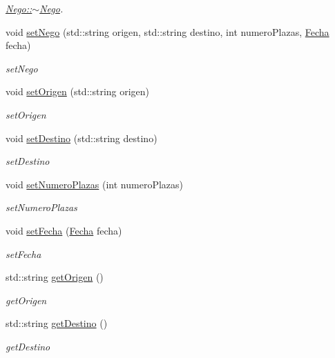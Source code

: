 \begin{DoxyCompactItemize}
\begin{DoxyCompactList}\small\item\em \hyperlink{classNego_af7be4e019e1aa8aaae080e9900574c74}{Nego\+::$\sim$\+Nego}. \end{DoxyCompactList}\item 
void \hyperlink{classNego_a886d652e1dd9f66c387978dbbcbf6aec}{set\+Nego} (std\+::string origen, std\+::string destino, int numero\+Plazas, \hyperlink{classFecha}{Fecha} fecha)
\begin{DoxyCompactList}\small\item\em set\+Nego \end{DoxyCompactList}\item 
void \hyperlink{classNego_ab9a55ac4fb4834dbede2806dbbcb62bb}{set\+Origen} (std\+::string origen)
\begin{DoxyCompactList}\small\item\em set\+Origen \end{DoxyCompactList}\item 
void \hyperlink{classNego_a037842afd947e4f33de78ecb4ce0485c}{set\+Destino} (std\+::string destino)
\begin{DoxyCompactList}\small\item\em set\+Destino \end{DoxyCompactList}\item 
void \hyperlink{classNego_ad3b026b1faf221046acb58ee10906ec8}{set\+Numero\+Plazas} (int numero\+Plazas)
\begin{DoxyCompactList}\small\item\em set\+Numero\+Plazas \end{DoxyCompactList}\item 
void \hyperlink{classNego_a8fd1c05283f046daab60ed330bac1795}{set\+Fecha} (\hyperlink{classFecha}{Fecha} fecha)
\begin{DoxyCompactList}\small\item\em set\+Fecha \end{DoxyCompactList}\item 
std\+::string \hyperlink{classNego_a6be2088a392ae71ae25ff281e8432cc3}{get\+Origen} ()
\begin{DoxyCompactList}\small\item\em get\+Origen \end{DoxyCompactList}\item 
std\+::string \hyperlink{classNego_ade01b1e886a2b8e68152338a0ffd1240}{get\+Destino} ()
\begin{DoxyCompactList}\small\item\em get\+Destino \end{DoxyCompactList}\item 

\end{DoxyCompactItemize}
